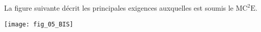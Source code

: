 \begin{multicols}{2}
\ifprof
\else

La figure suivante décrit les principales exigences auxquelles est soumis le $\text{MC}^2\text{E}$.

\begin{center}
\texttt{[image: fig\_05\_BIS]}
\end{center}
\fi



\end{multicols}
